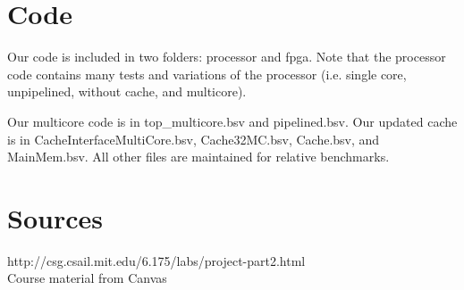 \documentclass{article}
\begin{document}



\section{Code}

Our code is included in two folders: processor and fpga. Note that the processor code contains many tests and variations of the processor (i.e. single core, unpipelined, without cache, and multicore). 

Our multicore code is in top\_multicore.bsv and pipelined.bsv. Our updated cache is in CacheInterfaceMultiCore.bsv, Cache32MC.bsv, Cache.bsv, and MainMem.bsv. All other files are maintained for relative benchmarks.

\section{Sources}

http://csg.csail.mit.edu/6.175/labs/project-part2.html
\\
Course material from Canvas
\end{document}
